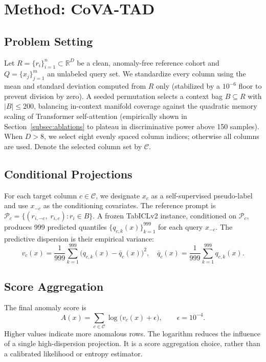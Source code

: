 \documentclass{article}
\begin{document}
\section{Method: CoVA-TAD}
\label{sec:method}

\subsection{Problem Setting}
\label{subsec:setting}
Let $R = \{r_i\}_{i=1}^{n} \subset \mathbb{R}^D$ be a clean, anomaly-free reference cohort and $Q = \{x_j\}_{j=1}^{m}$ an unlabeled query set. We standardize every column using the mean and standard deviation computed from $R$ only (stabilized by a $10^{-6}$ floor to prevent division by zero). A seeded permutation selects a context bag $B \subseteq R$ with $|B| \leq 200$, balancing in-context manifold coverage against the quadratic memory scaling of Transformer self-attention (empirically shown in Section~\ref{subsec:ablations} to plateau in discriminative power above 150 samples). When $D > 8$, we select eight evenly spaced column indices; otherwise all columns are used. Denote the selected column set by $\mathcal{C}$.

\subsection{Conditional Projections}
\label{subsec:projections}
For each target column $c \in \mathcal{C}$, we designate $x_c$ as a self-supervised pseudo-label and use $x_{-c}$ as the conditioning covariates. The reference prompt is $\mathcal{P}_c = \{(r_{i,-c},\; r_{i,c}) : r_i \in B\}$. A frozen TabICLv2 instance, conditioned on $\mathcal{P}_c$, produces 999 predicted quantiles $\{q_{c,k}(x)\}_{k=1}^{999}$ for each query $x_{-c}$. The predictive dispersion is their empirical variance:
\begin{equation}
  v_c(x) = \frac{1}{999}\sum_{k=1}^{999}\bigl(q_{c,k}(x) - \bar{q}_c(x)\bigr)^2, \quad
  \bar{q}_c(x) = \frac{1}{999}\sum_{k=1}^{999} q_{c,k}(x).
  \label{eq:variance}
\end{equation}

\subsection{Score Aggregation}
\label{subsec:score}
The final anomaly score is
\begin{equation}
  A(x) = \sum_{c \in \mathcal{C}} \log\!\bigl(v_c(x) + \epsilon\bigr), \qquad \epsilon = 10^{-4}.
  \label{eq:score}
\end{equation}
Higher values indicate more anomalous rows. The logarithm reduces the influence of a single high-dispersion projection. It is a score aggregation choice, rather than a calibrated likelihood or entropy estimator.
\end{document}
